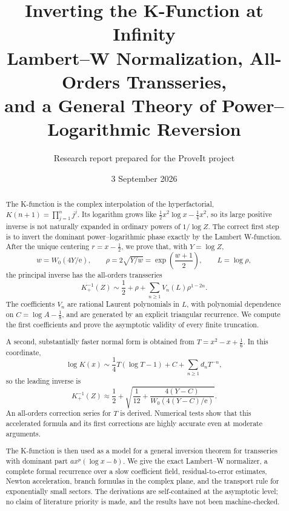 \documentclass[11pt,a4paper]{article}
\title{\textbf{Inverting the K-Function at Infinity}\\[4pt]
\large Lambert--W Normalization, All-Orders Transseries,\\
and a General Theory of Power--Logarithmic Reversion}
\author{Research report prepared for the ProveIt project}
\date{3 September 2026}
\numberwithin{equation}{section}
\theoremstyle{remark}
\newcommand{\e}{\mathrm e}
\begin{document}
\maketitle

\begin{abstract}
The K-function is the complex interpolation of the hyperfactorial,
\(K(n+1)=\prod_{j=1}^{n}j^j\).  Its logarithm grows like
\(\tfrac12x^2\log x-\tfrac14x^2\), so its large positive inverse is not
naturally expanded in ordinary powers of \(1/\log Z\).  The correct first
step is to invert the dominant power--logarithmic phase exactly by the
Lambert W-function.  After the unique centering \(r=x-\tfrac12\), we prove
that, with \(Y=\log Z\),
\[
 w=W_0(4Y/\e),\qquad
 \rho=2\sqrt{Y/w}=\exp\!\left(\frac{w+1}{2}\right),\qquad
 L=\log\rho,
\]
the principal inverse has the all-orders transseries
\[
 K_{+}^{-1}(Z)\sim \frac12+\rho+
 \sum_{n\ge1}V_n(L)\rho^{1-2n}.
\]
The coefficients \(V_n\) are rational Laurent polynomials in \(L\), with
polynomial dependence on \(C=\log A-\tfrac18\), and are generated by an
explicit triangular recurrence.  We compute the first coefficients and
prove the asymptotic validity of every finite truncation.

A second, substantially faster normal form is obtained from
\(T=x^2-x+\tfrac16\).  In this coordinate,
\[
 \log K(x)\sim \frac14T(\log T-1)+C+
 \sum_{n\ge1}d_nT^{-n},
\]
so the leading inverse is
\[
 K_{+}^{-1}(Z)\approx \frac12+
 \sqrt{\frac1{12}+
 \frac{4(Y-C)}{W_0(4(Y-C)/\e)}}.
\]
An all-orders correction series for \(T\) is derived.  Numerical tests show
that this accelerated formula and its first corrections are highly accurate
even at moderate arguments.

The K-function is then used as a model for a general inversion theorem for
transseries with dominant part \(a x^p(\log x-b)\).  We give the exact
Lambert--W normalizer, a complete formal recurrence over a slow coefficient
field, residual-to-error estimates, Newton acceleration, branch formulas in
the complex plane, and the transport rule for exponentially small sectors.
The derivations are self-contained at the asymptotic level; no claim of
literature priority is made, and the results have not been machine-checked.
\end{abstract}

\tableofcontents
\newpage
\end{document}
